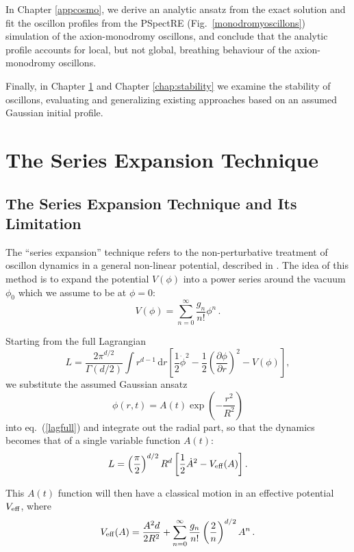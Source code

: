 \documentclass[11pt]{book}
\begin{document}
In Chapter \ref{appcosmo}, we derive an analytic ansatz from the exact solution and fit the oscillon profiles from the PSpectRE (Fig.~\ref{monodromyoscillons}) simulation of the axion-monodromy oscillons, and conclude that the analytic profile accounts for local, but not global, breathing behaviour of the axion-monodromy oscillons.

Finally, in Chapter \ref{nonpertprob} and Chapter \ref{chap:stability} we examine the stability of oscillons, evaluating and generalizing existing approaches based on an assumed Gaussian initial profile.

\chapter{The Series Expansion Technique}\label{nonpertprob}
\section{The Series Expansion Technique and Its Limitation}
The ``series expansion'' technique refers to the non-perturbative treatment of oscillon dynamics in a general non-linear potential, described in \cite{PhysRevD.80.125037, Gleiser:2008ty}. The idea of this method is to expand the potential $V(\phi)$ into a power series around the vacuum $\phi_0$ which we assume to be at $\phi=0$:
\begin{equation}
  V(\phi)=\sum_{n=0}^\infty \frac{g_n}{n!}\phi^n\,.
\end{equation}

Starting from the full Lagrangian
\begin{equation}\label{lagfull}
    L = \frac{2\pi^{d/2}}{\Gamma(d/2)}\int r^{d-1}\,\mathrm{d}r\left[\frac{1}{2}\dot{\phi}^2 -
      \frac{1}{2}\left(\frac{\partial\phi}{\partial r}\right)^2-V(\phi)\right],
\end{equation}
we substitute the assumed Gaussian ansatz
\begin{equation}
  \phi(r,t) = A(t) \exp\left(-\frac{r^2}{R^2}\right)
\end{equation}
into eq.~(\ref{lagfull}) and integrate out the radial part, so that the dynamics becomes that of a single variable function $A(t)$:
\begin{equation}
  L= \left(\frac{\pi}{2}\right)^{d/2}R^d\left[\frac{1}{2}\dot{A}^2 - V_{\rm eff}(A)\right].
\end{equation}

This $A(t)$ function will then have a classical motion in an effective potential $V_{\rm eff}$, where
\begin{equation}\label{effpot}
  V_{\rm eff}(A) = \frac{A^2d}{2R^2} +
  \sum_{n=0}^\infty \frac{g_n}{n!}\left(\frac{2}{n}\right)^{d/2} A^n\,.
\end{equation}
\end{document}
